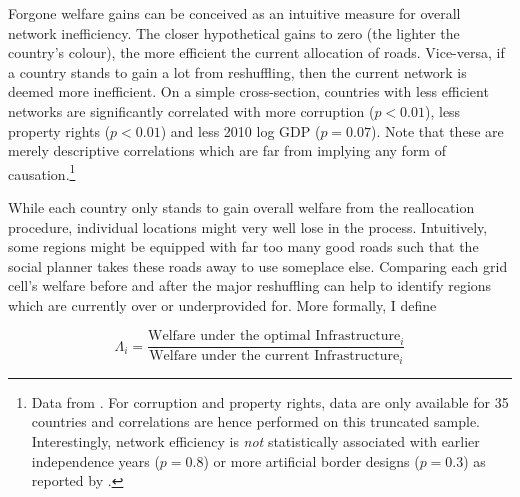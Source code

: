 \documentclass[11pt, oneside]{article}   	%
\begin{document}
Forgone welfare gains can be conceived as an intuitive measure for overall network inefficiency. The closer hypothetical gains to zero (the lighter the country's colour), the more efficient the current allocation of roads. Vice-versa, if a country stands to gain a lot from reshuffling, then the current network is deemed more inefficient. On a simple cross-section, countries with less efficient networks are significantly correlated with more corruption ($p < 0.01$), less property rights ($p < 0.01$) and less 2010 log GDP ($p=0.07$). Note that these are merely descriptive correlations which are far from implying any form of causation.\footnote{Data from \cite{TheWorldBank_WorldBankAnnual_2017}. For corruption and property rights, data are only available for 35 countries and correlations are hence performed on this truncated sample. Interestingly, network efficiency is \emph{not} statistically associated with earlier independence years ($p=0.8$) or more artificial border designs ($p=0.3$) as reported by \cite{Alesina_ArtificialStates_2011}.}

While each country only stands to gain overall welfare from the reallocation procedure, individual locations might very well lose in the process. Intuitively, some regions might be equipped with far too many good roads such that the social planner takes these roads away to use someplace else. Comparing each grid cell's welfare before and after the major reshuffling can help to identify regions which are currently over or underprovided for. More formally, I define

\begin{equation}
  \Lambda_{i} = \frac{\textrm{Welfare under the optimal Infrastructure}_{i}}{\textrm{Welfare under the current Infrastructure}_{i}}
\end{equation}
\end{document}
